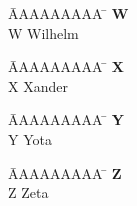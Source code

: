 \vspace*{-1.5cm}
\begin{tabbing}
	\hspace{0.0cm}  \= AAAAAAAAA \=       \hspace{2cm} \kill
	\>\textbf{W} 	\> \\
	\>W 			\>  Wilhelm\\
\end{tabbing}

\vspace*{-1.5cm}
\begin{tabbing}
	\hspace{0.0cm}  \= AAAAAAAAA \=       \hspace{2cm} \kill
	\>\textbf{X} 	\> \\
	\>X 			\>  Xander\\
\end{tabbing}

\vspace*{-1.5cm}
\begin{tabbing}
	\hspace{0.0cm}  \= AAAAAAAAA \=       \hspace{2cm} \kill
	\>\textbf{Y} 	\> \\
	\>Y 			\>  Yota\\
\end{tabbing}

\vspace*{-1.5cm}
\begin{tabbing}
	\hspace{0.0cm}  \= AAAAAAAAA \=       \hspace{2cm} \kill
	\>\textbf{Z} 	\> \\
	\>Z 			\>  Zeta\\
\end{tabbing}  
